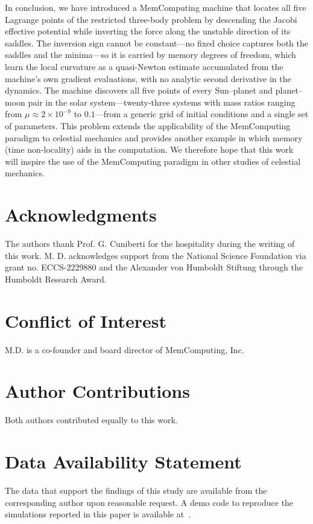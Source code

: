 \documentclass[aip,preprint,amsmath,amssymb,floatfix]{revtex4-2}
\begin{document}
In conclusion, we have introduced a MemComputing machine that locates all five Lagrange points of
the restricted three-body problem by descending the Jacobi effective potential while 
inverting the force along the unstable direction of its saddles. The inversion sign
cannot be constant---no fixed choice captures both the saddles and the minima---so it
is carried by memory degrees of freedom, which learn the local curvature as
a quasi-Newton estimate accumulated from the machine's own gradient evaluations, with
no analytic second derivative in the dynamics. The machine discovers all five points
of every Sun--planet and planet--moon pair in the solar system---twenty-three systems with mass ratios ranging  
from $\mu\approx2\times10^{-9}$ to $0.1$---from a generic grid of initial conditions and a single
set of parameters. This problem extends the applicability of the MemComputing paradigm to celestial
mechanics and provides another example in which memory (time non-locality)
aids in the computation. We therefore hope that this work will inspire the use of the MemComputing paradigm in other studies of celestial mechanics. 

\section*{Acknowledgments}
The authors thank Prof. G. Cuniberti for the hospitality during the writing of this work. M. D. acknowledges support from the National Science Foundation via grant no. ECCS-2229880 and the Alexander von Humboldt Stiftung through the Humboldt Research Award.

\section*{Conflict of Interest}
M.D. is a co-founder and board director of MemComputing, Inc.

\section*{Author Contributions}
Both authors contributed equally to this work.

\section*{Data Availability Statement}

The data that support the findings of this study are available
from the corresponding author upon reasonable request. A demo code to reproduce the simulations reported in this paper is
available at~\cite{github2026}.
\end{document}
